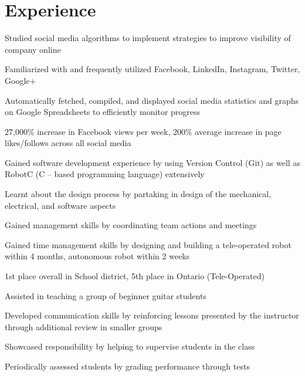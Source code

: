 \documentclass[]{resume-openfont}
\begin{document}
\begin{minipage}[t]{0.66\textwidth} 


\section{Experience}

\vspace{\topsep} %
\begin{tightemize}\item Studied social media algorithms to implement strategies to improve visibility of company online \item Familiarized with and frequently utilized Facebook, LinkedIn, Instagram, Twitter, Google+ \item Automatically fetched, compiled, and displayed social media statistics and graphs on Google Spreadsheets to efficiently monitor progress \item 27,000\% increase in Facebook views per week, 200\% average increase in page likes/follows across all social media\end{tightemize}
\sectionsep

\begin{tightemize}
\item Gained software development experience by using Version Control (Git) as well as RobotC (C – based programming language) extensively \item Learnt about the design process by partaking in design of the mechanical, electrical, and software aspects \item Gained management skills by coordinating team actions and meetings \item Gained time management skills by designing and building a tele-operated robot within 4 months, autonomous robot within 2 weeks \item 1st place overall in School district, 5th place in Ontario (Tele-Operated) \end{tightemize}
\sectionsep

\begin{tightemize}
\item Assisted in teaching a group of beginner guitar students \item Developed communication skills by reinforcing lessons presented by the instructor through additional review in smaller groups \item Showcased responsibility by helping to supervise students in the class \item Periodically assessed students by grading performance through tests\end{tightemize}
\sectionsep


\end{minipage}
\end{document}
